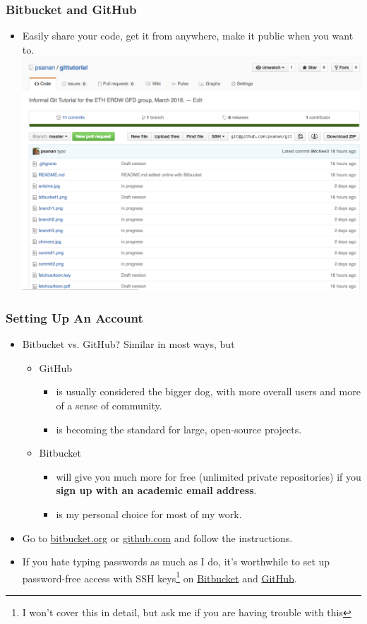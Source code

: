 \documentclass{beamer}
\begin{document}
\begin{frame}[fragile]
\frametitle{Bitbucket and GitHub}
\begin{itemize}
\item Easily share your code, get it from anywhere, make it public when you want to. \\
\includegraphics[scale=0.3]{github1}
\end{itemize}
\end{frame}

\begin{frame}[fragile]
\frametitle{Setting Up An Account}
\begin{itemize}
\item Bitbucket vs. GitHub? Similar in most ways, but
\begin{itemize}
\item
GitHub
\begin{itemize}
\item
is usually considered the bigger dog, with more overall users and more of a sense of community. 
\item is becoming the standard for large, open-source projects.
\end{itemize}
\item Bitbucket 
\begin{itemize}
\item will give you much more for free (unlimited private repositories) if you \textbf{sign up with an academic email address}. 
\item is my personal choice for most of my work.
\end{itemize}
\end{itemize}
\item Go to \href{https://bitbucket.org}{bitbucket.org} or \href{https://github.com}{github.com} and follow the instructions.
\item If you hate typing passwords as much as I do, it's worthwhile to set up password-free access with SSH keys\footnote{I won't cover this in detail, but ask me if you are having trouble with this} on
\href{https://confluence.atlassian.com/bitbucket/set-up-ssh-for-git-728138079.html}{Bitbucket} and
\href{https://help.github.com/articles/adding-a-new-ssh-key-to-your-github-account/}{GitHub}.
\end{itemize}
\end{frame}
\end{document}
